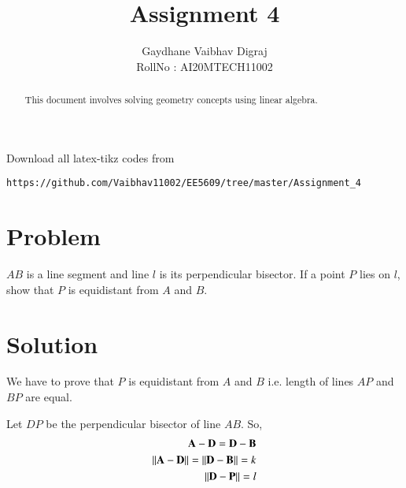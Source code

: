 \documentclass[journal,12pt,twocolumn]{IEEEtran}
\begin{document}
\makeatletter
{}
\makeatother
\let\StandardTheFigure\thefigure
\let\vec\mathbf
\renewcommand{\thefigure}{\theproblem}
\def\putbox#1#2#3{\makebox[0in][l]{\makebox[#1][l]{}\raisebox{\baselineskip}[0in][0in]{\raisebox{#2}[0in][0in]{#3}}}}
     \def\rightbox#1{\makebox[0in][r]{#1}}
     \def\centbox#1{\makebox[0in]{#1}}
     \def\topbox#1{\raisebox{-\baselineskip}[0in][0in]{#1}}
     \def\midbox#1{\raisebox{-0.5\baselineskip}[0in][0in]{#1}}
\vspace{3cm}
\title{Assignment 4}
\author{Gaydhane Vaibhav Digraj \\ RollNo : AI20MTECH11002}
\maketitle
\newpage
\bigskip
\renewcommand{\thefigure}{\theenumi}
\renewcommand{\thetable}{\theenumi}

\begin{abstract}
This document involves solving geometry concepts using linear algebra.
\end{abstract}
Download all latex-tikz codes from 
%
\begin{lstlisting}
https://github.com/Vaibhav11002/EE5609/tree/master/Assignment_4
\end{lstlisting}
%
\section{Problem}
$AB$ is a line segment and line $l$ is its perpendicular bisector. If a point $P$ lies on $l$, show
that $P$ is equidistant from $A$ and $B$. 

\section{Solution}

We have to prove that $P$ is equidistant from $A$ and $B$ i.e. length of lines $AP$ and $BP$ are equal. 

Let $DP$ be the perpendicular bisector of line $AB$. So,
\begin{align}
    \vec{A}-\vec{D} = \vec{D} - \vec{B} \\
    \norm{\vec{A}-\vec{D}} = \norm{\vec{D} - \vec{B}} = k \\
    \norm{\vec{D}-\vec{P}} = l
\end{align}
\end{document}
